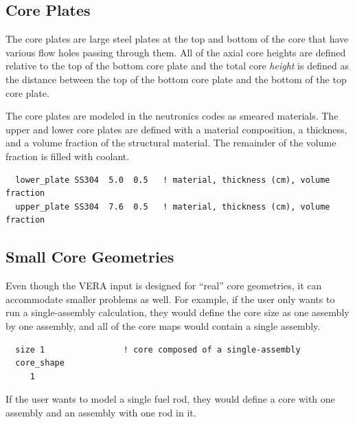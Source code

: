 \subsection{Core Plates}

The core plates are large steel plates at the top and bottom of the core that have
various flow holes passing through them.  All of the axial core heights are defined relative to the
top of the bottom core plate and the total core {\it height} is defined as the distance
between the top of the bottom core plate and the bottom of the top core plate.

The core plates are modeled in the neutronics codes as smeared materials.
The upper and lower core plates are defined with a material composition, a thickness, and a
volume fraction of the structural material.
The remainder of the volume fraction is filled with coolant.

\begin{verbatim}
  lower_plate SS304  5.0  0.5   ! material, thickness (cm), volume fraction
  upper_plate SS304  7.6  0.5   ! material, thickness (cm), volume fraction
\end{verbatim}

\subsection{Small Core Geometries}
\label{sec:smallcoregeom}

Even though the VERA input is designed for ``real'' core geometries, it can accommodate smaller
problems as well.
For example, if the user only wants to run a single-assembly calculation, they would define the core size
as one assembly by one assembly, and all of the core maps would contain a single assembly.
\begin{verbatim}
  size 1                ! core composed of a single-assembly
  core_shape
     1
\end{verbatim}

If the user wants to model a single fuel rod, they would define a core with one assembly and
an assembly with one rod in it.

